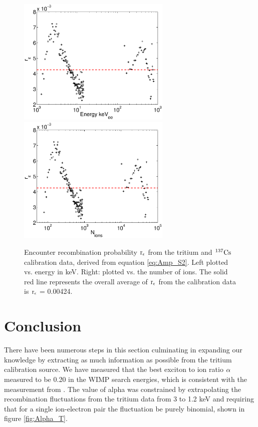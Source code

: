 \begin{figure}[h!]\centering
\includegraphics[width=73mm]{Chapter_Flucs/Figures/Recomb_Flucs/E_const.eps}
\includegraphics[width=73mm]{Chapter_Flucs/Figures/Recomb_Flucs/Ni_const.eps}
\caption{ Encounter recombination probability $\rm r_\epsilon$ from the tritium and $\rm^{137}Cs$ calibration data, derived from equation \ref{eq:Amp_S2}. Left plotted vs. energy in keV. Right: plotted vs. the number of ions. The solid red line represents the overall average of $\rm r_\epsilon$ from the calibration data is $\rm r_\epsilon$ = 0.00424. }
\label{fig:Encounter_R_Const}
\end{figure}





\section{Conclusion}


There have been numerous steps in this section culminating in expanding our knowledge by extracting as much information as possible from the tritium calibration source. We have measured that the best exciton to ion ratio $\rm \alpha$ measured to be 0.20 in the WIMP search energies, which is consistent with the measurement from \cite{Doke_alpha}. The value of alpha was constrained by extrapolating the recombination fluctuations from the tritium data from 3 to 1.2 keV and requiring that for a single ion-electron pair the fluctuation be purely binomial, shown in figure \ref{fig:Alpha_T}.

